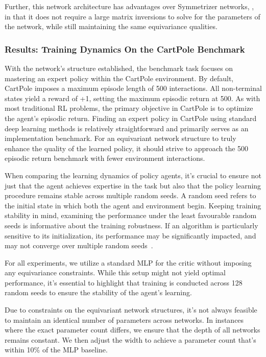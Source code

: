 Further, this network architecture has advantages over Symmetrizer networks, \cite{vanderpol2020mdp}, in that it does not require a large matrix inversions to solve for the parameters of the network, while still maintaining the same equivariance qualities.

\subsubsection{Results: Training Dynamics On the CartPole Benchmark}
With the network's structure established, the benchmark task focuses on mastering an expert policy within the CartPole environment. By default, CartPole imposes a maximum episode length of 500 interactions. All non-terminal states yield a reward of +1, setting the maximum episodic return at 500. As with most traditional RL problems, the primary objective in CartPole is to optimize the agent's episodic return. Finding an expert policy in CartPole using standard deep learning methods is relatively straightforward and primarily serves as an implementation benchmark. For an equivariant network structure to truly enhance the quality of the learned policy, it should strive to approach the 500 episodic return benchmark with fewer environment interactions.

When comparing the learning dynamics of policy agents, it's crucial to ensure not just that the agent achieves expertise in the task but also that the policy learning procedure remains stable across multiple random seeds. A random seed refers to the initial state in which both the agent and environment begin. Keeping training stability in mind, examining the performance under the least favourable random seeds is informative about the training robustness. If an algorithm is particularly sensitive to its initialization, its performance may be significantly impacted, and may not converge over multiple random seeds~\cite{henderson2018deep}.

For all experiments, we utilize a standard MLP for the critic without imposing any equivariance constraints. While this setup might not yield optimal performance, it's essential to highlight that training is conducted across 128 random seeds to ensure the stability of the agent's learning.

Due to constraints on the equivariant network structures, it's not always feasible to maintain an identical number of parameters across networks. In instances where the exact parameter count differs, we ensure that the depth of all networks remains constant. We then adjust the width to achieve a parameter count that's within 10\% of the MLP baseline.

